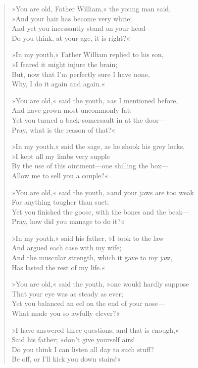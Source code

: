 \begin{verse}

»You are old, Father William,« the young man said,\\
\vin »And your hair has become very white;\\
And yet you incessantly stand on your head—\\
\vin Do you think, at your age, it is right?«

\enlargethispage{\baselineskip}
»In my youth,« Father William replied to his son,\\
\vin »I feared it might injure the brain;\\
But, now that I'm perfectly sure I have none,\\
\vin Why, I do it again and again.«

»You are old,« said the youth, »as I mentioned before,\\
\vin And have grown most uncommonly fat;\\
Yet you turned a back-somersault in at the door—\\
\vin Pray, what is the reason of that?«

»In my youth,« said the sage, as he shook his grey locks,\\
\vin »I kept all my limbs very supple\\
By the use of this ointment—one shilling the box—\\
\vin Allow me to sell you a couple?«

»You are old,« said the youth, »and your jaws are too weak\\
\vin For anything tougher than suet;\\
Yet you finished the goose, with the bones and the beak—\\
\vin Pray, how did you manage to do it?«

»In my youth,« said his father, »I took to the law\\
\vin And argued each case with my wife;\\
And the muscular strength, which it gave to my jaw,\\
\vin Has lasted the rest of my life.«

»You are old,« said the youth, »one would hardly suppose\\
\vin That your eye was as steady as ever;\\
Yet you balanced an eel on the end of your nose—\\
\vin What made you so awfully clever?«

»I have answered three questions, and that is enough,«\\
\vin Said his father; »don't give yourself airs!\\
Do you think I can listen all day to such stuff?\\
\vin Be off, or I'll kick you down stairs!«

\end{verse}

